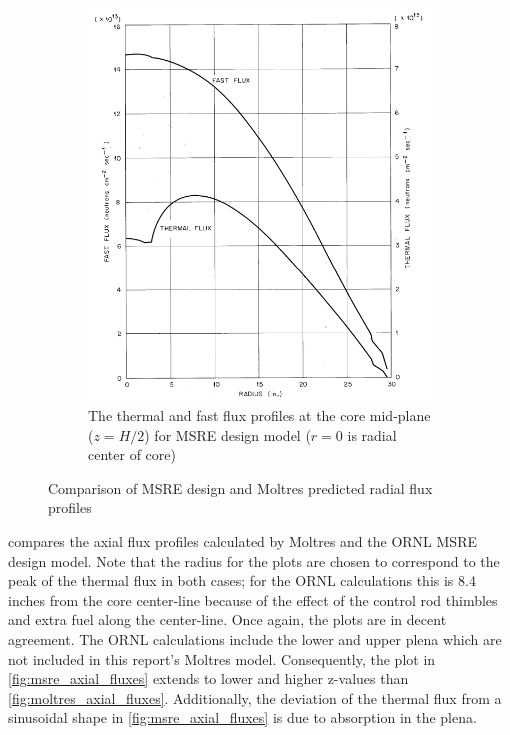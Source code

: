 \documentclass{article}
\makeatletter
\def\maxwidth#1{\ifdim\Gin@nat@width>#1 #1\else\Gin@nat@width\fi}
\makeatother
\begin{document}
\begin{figure}[htpb]
\begin{subfigure}[b]{.5\textwidth}
      \includegraphics[width=\maxwidth{\textwidth}]{msre_radial_fluxes.png}
      \caption{The thermal and fast flux profiles at the core mid-plane
        ($z=H/2$) for \gls{MSRE} design model \cite{briggs_molten-salt_1964}
        ($r=0$ is radial center of core)}
      \label{fig:msre_radial_fluxes}
    \end{subfigure}
    \caption{Comparison of \gls{MSRE} design and Moltres predicted radial
      flux profiles}
    \label{fig:radial_fluxes_compare}
\end{figure}

 compares the axial flux profiles calculated by
Moltres and the \gls{ORNL} \gls{MSRE} design model. Note that the radius for the
plots are chosen to correspond to the peak of the thermal flux in both cases;
for the \gls{ORNL} calculations this is 8.4 inches from the core center-line
because of the effect of the control rod thimbles and extra fuel along the
center-line. Once again, the plots are in decent agreement. The \gls{ORNL}
calculations include the lower and upper plena which are not included in this
report's Moltres model. Consequently, the plot in \cref{fig:msre_axial_fluxes}
extends to lower and higher z-values than
\cref{fig:moltres_axial_fluxes}. Additionally, the deviation of the thermal flux
from a sinusoidal shape in \cref{fig:msre_axial_fluxes} is due to absorption in
the plena.
\end{document}
